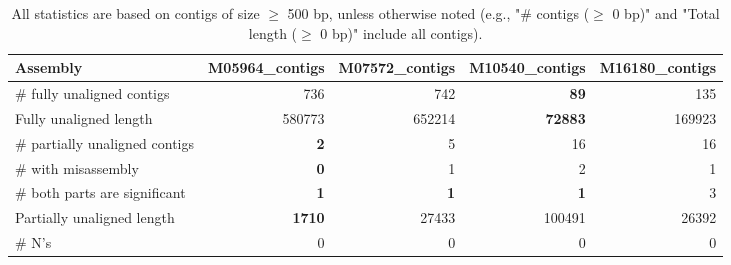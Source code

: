\documentclass[12pt,a4paper]{article}
\begin{document}
\begin{table}[ht]
\begin{center}
\caption{All statistics are based on contigs of size $\geq$ 500 bp, unless otherwise noted (e.g., "\# contigs ($\geq$ 0 bp)" and "Total length ($\geq$ 0 bp)" include all contigs).}
\begin{tabular}{|l*{4}{|r}|}
\hline
Assembly & M05964\_contigs & M07572\_contigs & M10540\_contigs & M16180\_contigs \\ \hline
\# fully unaligned contigs & 736 & 742 & {\bf 89} & 135 \\ \hline
Fully unaligned length & 580773 & 652214 & {\bf 72883} & 169923 \\ \hline
\# partially unaligned contigs & {\bf 2} & 5 & 16 & 16 \\ \hline
\hspace{5mm}\# with misassembly & {\bf 0} & 1 & 2 & 1 \\ \hline
\hspace{5mm}\# both parts are significant & {\bf 1} & {\bf 1} & {\bf 1} & 3 \\ \hline
Partially unaligned length & {\bf 1710} & 27433 & 100491 & 26392 \\ \hline
\# N's & 0 & 0 & 0 & 0 \\ \hline
\end{tabular}
\end{center}
\end{table}
\end{document}
